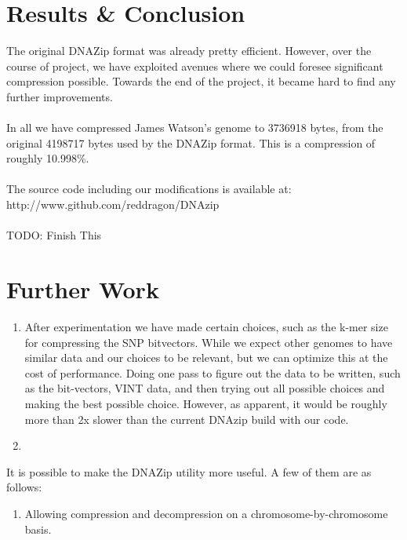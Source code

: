 \documentclass{article}
\begin{document}
\clearpage

\section {Results \& Conclusion}
The original DNAZip format was already pretty efficient. However, over the course of project, we have exploited avenues where we could foresee significant compression possible. Towards the end of the project, it became hard to find any further improvements.\\
\\
In all we have compressed James Watson's genome to 3736918 bytes, from the original 4198717 bytes used by the DNAZip format. This is a compression of roughly 10.998\%. \\
\\
The source code including our modifications is available at: \\
http://www.github.com/reddragon/DNAzip\\
\\
TODO: Finish This
\clearpage

\section {Further Work}

\begin{enumerate}
\item After experimentation we have made certain choices, such as the k-mer size
for compressing the SNP bitvectors. While we expect other genomes to have similar
data and our choices to be relevant, but we can optimize this at the cost of
performance. Doing one pass to figure out the data to be written, such as the 
bit-vectors, VINT data, and then trying out all possible choices and making the
best possible choice. However, as apparent, it would be roughly more than 2x slower
than the current DNAzip build with our code.

\item 

\end{enumerate}

It is possible to make the DNAZip utility more useful. A few of them are as follows:

\begin{enumerate}
\item Allowing compression and decompression on a chromosome-by-chromosome basis.
\end{enumerate}
\end{document}
